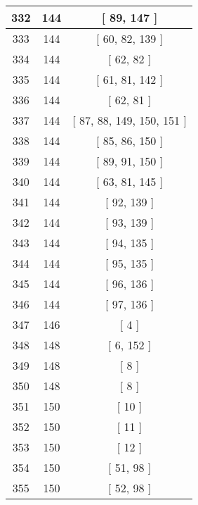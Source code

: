 \begin{center}
\begin{longtable}[H]{|| c c c ||}
332 & 144 & [ 89, 147 ]
\\\hline
333 & 144 & [ 60, 82, 139 ]
\\\hline
334 & 144 & [ 62, 82 ]
\\\hline
335 & 144 & [ 61, 81, 142 ]
\\\hline
336 & 144 & [ 62, 81 ]
\\\hline
337 & 144 & [ 87, 88, 149, 150, 151 ]
\\\hline
338 & 144 & [ 85, 86, 150 ]
\\\hline
339 & 144 & [ 89, 91, 150 ]
\\\hline
340 & 144 & [ 63, 81, 145 ]
\\\hline
341 & 144 & [ 92, 139 ]
\\\hline
342 & 144 & [ 93, 139 ]
\\\hline
343 & 144 & [ 94, 135 ]
\\\hline
344 & 144 & [ 95, 135 ]
\\\hline
345 & 144 & [ 96, 136 ]
\\\hline
346 & 144 & [ 97, 136 ]
\\\hline
347 & 146 & [ 4 ]
\\\hline
348 & 148 & [ 6, 152 ]
\\\hline
349 & 148 & [ 8 ]
\\\hline
350 & 148 & [ 8 ]
\\\hline
351 & 150 & [ 10 ]
\\\hline
352 & 150 & [ 11 ]
\\\hline
353 & 150 & [ 12 ]
\\\hline
354 & 150 & [ 51, 98 ]
\\\hline
355 & 150 & [ 52, 98 ]
\\\hline
\end{longtable}
\end{center}
